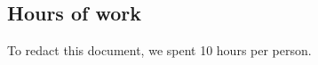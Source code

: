  \begin{appendices}

\chapter{Hours of work}
To redact this document, we spent 10 hours per person.

\end{appendices}